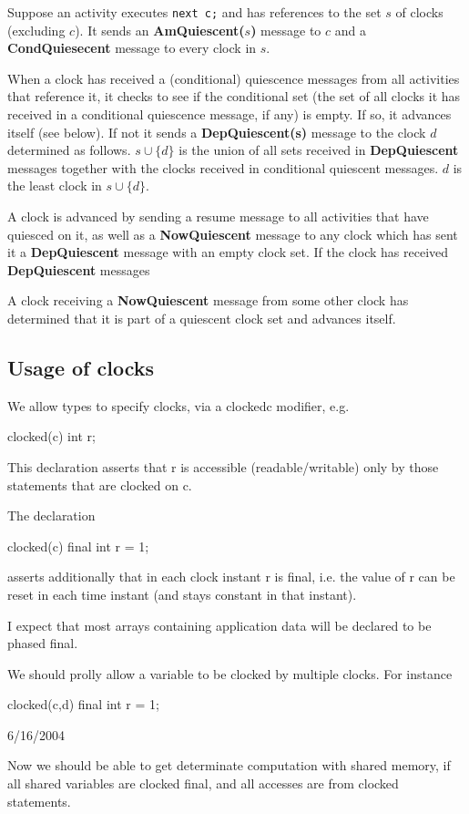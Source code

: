 Suppose an activity
executes {\tt next c;} and has references to the set $s$ of clocks
(excluding $c$). It sends an {\bf AmQuiescent($s$)} message to $c$
and a {\bf CondQuiesecent} message to every clock in $s$.

When a clock has received a (conditional) quiescence messages from all
activities that reference it, it checks to see if the conditional set
(the set of all clocks it has received in a conditional quiescence
message, if any) is empty. If so, it advances itself (see below). If
not it sends a {\bf DepQuiescent(s)} message to the clock $d$
determined as follows. $s \cup \{d\}$ is the union of all sets
received in {\bf DepQuiescent} messages together with the clocks
received in conditional quiescent messages. $d$ is the least clock in
$s\cup\{d\}$.

A clock is advanced by sending a resume message to all activities that
have quiesced on it, as well as a {\bf NowQuiescent} message to any
clock which has sent it a {\bf DepQuiescent} message with an empty
clock set. If the clock has received {\bf DepQuiescent} messages 

A clock receiving a {\bf NowQuiescent} message from some other clock
has determined that it is part of a quiescent clock set and 
advances itself.

\subsection{Usage of clocks}

We allow types to specify clocks, via a clocked{c} modifier, e.g.

  clocked(c) int r;

This declaration asserts that r is accessible (readable/writable) only
by those statements that are clocked on c. 

The declaration 

  clocked(c) final int r = 1;

asserts additionally that in each clock instant r is final, i.e. the
value of r can be reset in each time instant (and stays constant in
that instant).

I expect that most arrays containing application data will be declared
to be phased final.

We should prolly allow a variable to be clocked by multiple
clocks.  For instance

  clocked(c,d) final int r = 1;

6/16/2004

Now we should be able to get determinate computation with shared
memory, if all shared variables are clocked final, and all accesses
are from clocked statements.

